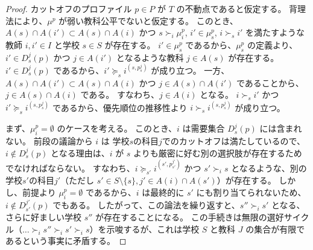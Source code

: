 \documentclass[12pt, a4paper]{article}
\theoremstyle{definition}
\theoremstyle{remark}
\theoremstyle{plain}
\begin{document}
\begin{proof}

カットオフのプロファイル \( p \in P\) が \( T \) の不動点であると仮定する。
背理法により、\( \mu^{p} \) が弱い教科公平でないと仮定する。
このとき、$A(s) \cap A(i')\subset A(s) \cap A(i)$ かつ $s \succ_i \mu_i^p$, $i' \in \mu_s^p$, $i \succ_s i'$ を満たすような教師 $i,i' \in I$ と学校 $s \in S$ が存在する。
$i' \in \mu^{p}_s$ であるから、$\mu^{p}_s$ の定義より、$i' \in D_s^j(p)$ かつ $j \in A(i')$ となるような教科 $j \in A(s)$ が存在する。
$i' \in D_s^j(p)$ であるから、$i' \succeq_s i^{(s,p_s^j)}$ が成り立つ。
一方、$A(s) \cap A(i')\subset A(s) \cap A(i)$ かつ $j \in A(s) \cap A(i')$ であることから、$j \in A(s) \cap A(i)$ である。
すなわち、$j \in A(i)$ となる。
$i \succ_s i'$ かつ $i' \succeq_s i^{(s,p_s^j)}$ であるから、優先順位の推移性より $i \succ_s i^{(s,p_s^j)}$ が成り立つ。

  

まず、\( \mu_i^p = \emptyset \) のケースを考える。
このとき、\( i \) は需要集合 \( D_s^j(p) \) には含まれない。
前段の議論から \( i \) は 学校$s$の科目$j$でのカットオフは満たしているので、\( i \notin D_s^j(p) \) となる理由は、\( i \) が \( s \) よりも厳密に好む別の選択肢が存在するためでなければならない。
すなわち、\( i \succeq_{s'} i^{(s',p^{j'}_{s'})} \) かつ \( s' \succ_i s \) となるような、別の学校$s'$の科目$j'$（ただし \( s' \in S\setminus \{s\}, j' \in A(i) \cap A(s') \)）が存在する。
しかし、前提より \( \mu_i^p = \emptyset \) であるから、\( i \) は最終的に \( s' \) にも割り当てられないため、\( i \notin D_{s'}^{j'}(p) \) でもある。
したがって、この論法を繰り返すと、\( s'' \succ_i s' \) となる、さらに好ましい学校 \( s'' \) が存在することになる。
この手続きは無限の選好サイクル（\( \dots \succ_i s'' \succ_i s' \succ_i s \)）を示唆するが、これは学校 \( S \) と教科 \( J \) の集合が有限であるという事実に矛盾する。



\end{proof}
\end{document}
